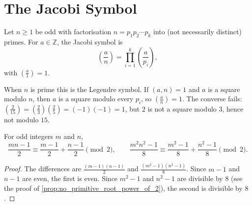 \section{The Jacobi Symbol}

\begin{definition}\label{def:jacobi}
    Let $n \ge 1$ be odd with factorisation $n = p_1 p_2 \cdots p_k$ into (not necessarily distinct) primes. For $a \in \mathbb{Z}$, the Jacobi symbol is
    \begin{equation*}
        \left(\frac{a}{n}\right) = \prod_{i=1}^{k} \left(\frac{a}{p_i}\right),
    \end{equation*}
    with $\left(\frac{a}{1}\right) = 1$.
\end{definition}
When $n$ is prime this is the Legendre symbol. If $(a,n) = 1$ and $a$ is a square modulo $n$, then $a$ is a square modulo every $p_i$, so $\left(\frac{a}{n}\right) = 1$. The converse fails: $\left(\frac{2}{15}\right) = \left(\frac{2}{3}\right)\left(\frac{2}{5}\right) = (-1)(-1) = 1$, but $2$ is not a square modulo $3$, hence not modulo $15$.

\begin{lemma}\label{lem:odd_additive}
    For odd integers $m$ and $n$,
    \begin{equation*}
        \frac{mn - 1}{2} \equiv \frac{m-1}{2} + \frac{n-1}{2} \pmod 2, \qquad \frac{m^2n^2 - 1}{8} \equiv \frac{m^2 - 1}{8} + \frac{n^2 - 1}{8} \pmod 2.
    \end{equation*}
\end{lemma}
\begin{proof}
    The differences are $\frac{(m-1)(n-1)}{2}$ and $\frac{(m^2-1)(n^2-1)}{8}$. Since $m - 1$ and $n - 1$ are even, the first is even. Since $m^2 - 1$ and $n^2 - 1$ are divisible by $8$ (see the proof of \cref{prop:no_primitive_root_power_of_2}), the second is divisible by $8$.
\end{proof}

